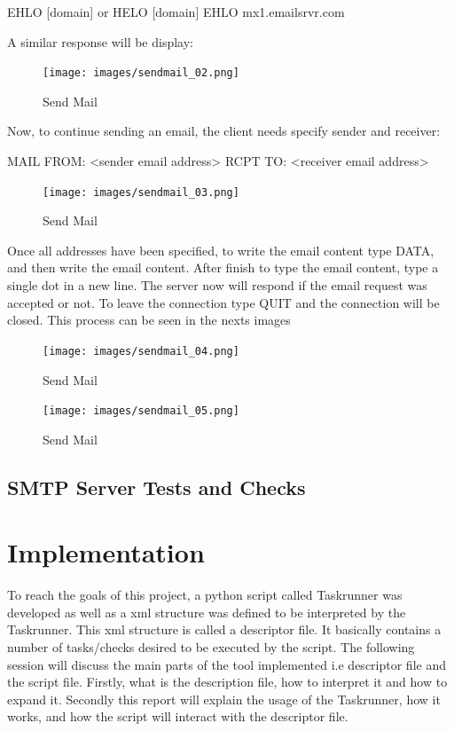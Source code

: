 \documentclass[a4paper, 12pt]{article}
\begin{document}
EHLO [domain] or HELO [domain]
EHLO mx1.emailsrvr.com

A similar response will be display:
\begin{figure}
	\centering
	\texttt{[image: images/sendmail\_02.png]}
	\caption{Send Mail}
	\label{img:sendmail_02}
\end{figure}

Now, to continue sending an email, the client needs specify sender and receiver:

MAIL FROM: <sender email address>
RCPT TO: <receiver email address>

\begin{figure}
	\centering
	\texttt{[image: images/sendmail\_03.png]}
	\caption{Send Mail}
	\label{img:sendmail_03}
\end{figure}

Once all addresses have been specified, to write the email content type DATA, and then write the email content. After finish to type the email content, type a single dot in a new line. The server now will respond if the email request was accepted or not. To leave the connection type QUIT and the connection will be closed. This process can be seen in the nexts images

\begin{figure}
	\centering
	\texttt{[image: images/sendmail\_04.png]}
	\caption{Send Mail}
	\label{img:sendmail_04}
\end{figure}

\begin{figure}
	\centering
	\texttt{[image: images/sendmail\_05.png]}
	\caption{Send Mail}
	\label{img:sendmail_05}
\end{figure}

\subsection{SMTP Server Tests and Checks}

\section{Implementation}

	To reach the goals of this project, a python script called Taskrunner was developed as well as a xml structure was defined to be interpreted by the
Taskrunner. This xml structure is called a descriptor file. It basically contains a number of tasks/checks desired to be executed by the script. The
following session will discuss the main parts of the tool implemented i.e descriptor file and the script file. Firstly, what is the description file,
how to interpret it and how to expand it. Secondly this report will explain the usage of the Taskrunner, how it works, and how the script will interact
with the descriptor file.\\
\end{document}
